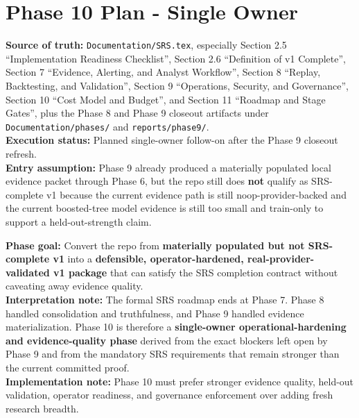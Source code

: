 \documentclass{article}
\begin{document}
\section*{Phase 10 Plan - Single Owner}

\textbf{Source of truth:} \texttt{Documentation/SRS.tex}, especially Section 2.5 ``Implementation Readiness Checklist'', Section 2.6 ``Definition of v1 Complete'', Section 7 ``Evidence, Alerting, and Analyst Workflow'', Section 8 ``Replay, Backtesting, and Validation'', Section 9 ``Operations, Security, and Governance'', Section 10 ``Cost Model and Budget'', and Section 11 ``Roadmap and Stage Gates'', plus the Phase 8 and Phase 9 closeout artifacts under \texttt{Documentation/phases/} and \texttt{reports/phase9/}.\\
\textbf{Execution status:} Planned single-owner follow-on after the Phase 9 closeout refresh.\\
\textbf{Entry assumption:} Phase 9 already produced a materially populated local evidence packet through Phase 6, but the repo still does \textbf{not} qualify as SRS-complete v1 because the current evidence path is still noop-provider-backed and the current boosted-tree model evidence is still too small and train-only to support a held-out-strength claim.

\textbf{Phase goal:} Convert the repo from \textbf{materially populated but not SRS-complete v1} into a \textbf{defensible, operator-hardened, real-provider-validated v1 package} that can satisfy the SRS completion contract without caveating away evidence quality.\\
\textbf{Interpretation note:} The formal SRS roadmap ends at Phase 7. Phase 8 handled consolidation and truthfulness, and Phase 9 handled evidence materialization. Phase 10 is therefore a \textbf{single-owner operational-hardening and evidence-quality phase} derived from the exact blockers left open by Phase 9 and from the mandatory SRS requirements that remain stronger than the current committed proof.\\
\textbf{Implementation note:} Phase 10 must prefer stronger evidence quality, held-out validation, operator readiness, and governance enforcement over adding fresh research breadth.
\end{document}
